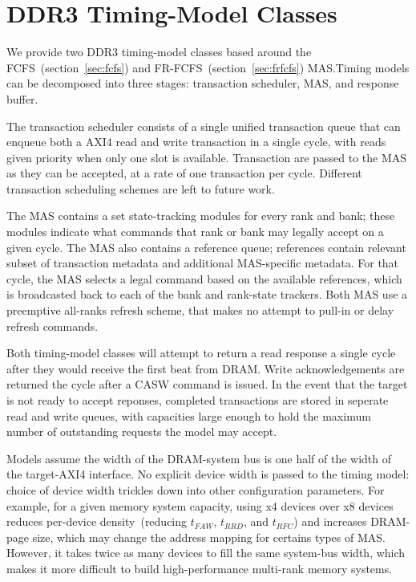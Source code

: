 \clearpage
\section{DDR3 Timing-Model Classes}

We provide two DDR3 timing-model classes based around the
FCFS~(section~\ref{sec:fcfs}) and FR-FCFS~(section~\ref{sec:frfcfs}) MAS.Timing models can be decomposed into
three stages: transaction scheduler, MAS, and response buffer.

The transaction scheduler consists of a single unified transaction queue that
can enqueue both a AXI4 read and write transaction in a single cycle, with reads
given priority when only one slot is available. Transaction are passed to the
MAS as they can be accepted, at a rate of one transaction per cycle.  Different
transaction scheduling schemes are left to future work.

The MAS contains a set state-tracking modules for every rank and bank; these
modules indicate what commands that rank or bank may legally accept on a given
cycle. The MAS also contains a reference queue; references contain relevant
subset of transaction metadata and additional MAS-specific metadata.  For that
cycle, the MAS selects a legal command based on the available references, which
is broadcasted back to each of the bank and rank-state trackers.  Both MAS use
a preemptive all-ranks refresh scheme, that makes no attempt to pull-in or
delay refresh commands.

Both timing-model classes will attempt to return a read response a single cycle after they would
receive the first beat from DRAM. Write acknowledgements are returned the
cycle after a CASW command is issued. In the event that the target is not ready
to accept reponses, completed transactions are stored in seperate read and
write queues, with capacities large enough to hold the maximum number of
outstanding requests the model may accept.

Models assume the width of the DRAM-system bus is one half of the width of the
target-AXI4 interface. No explicit device width is passed to the timing
model: choice of device width trickles down into other configuration
parameters. For example, for a given memory system capacity, using x4 devices
over x8 devices reduces per-device density~(reducing $t_{FAW}$,
$t_{RRD}$, and $t_{RFC}$) and increases DRAM-page size, which may change the
address mapping for certains types of MAS.  However, it takes twice as many
devices to fill the same system-bus width, which makes it more difficult to
build high-performance multi-rank memory systems.

